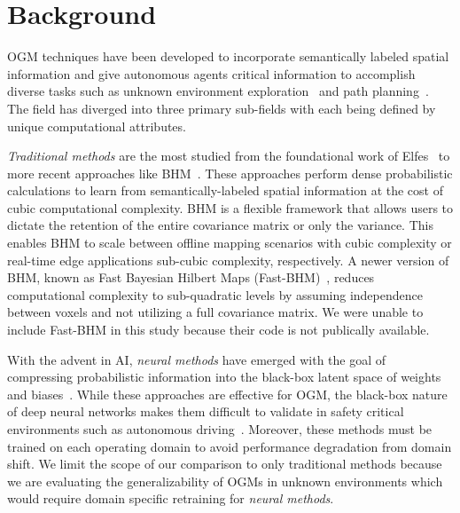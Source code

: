 \section{Background}
\label{sec:background}

\noindent
OGM techniques have been developed to incorporate semantically labeled spatial information and give autonomous agents critical information to accomplish diverse tasks such as unknown environment exploration~\cite{robotics13010012} and path planning~\cite{zhao2024exploration}. The field has diverged into three primary sub-fields with each being defined by unique computational attributes.

\textit{Traditional methods} are the most studied from the foundational work of Elfes~\cite{elfes1989using} to more recent approaches like BHM~\cite{senanayake2017bayesian}. These approaches perform dense probabilistic calculations to learn from semantically-labeled spatial information at the cost of cubic computational complexity. BHM is a flexible framework that allows users to dictate the retention of the entire covariance matrix or only the variance. This enables BHM to scale between offline mapping scenarios with cubic complexity or real-time edge applications sub-cubic complexity, respectively.  
A newer version of BHM, known as Fast Bayesian Hilbert Maps (Fast-BHM)~\cite{zhi2019continuous}, reduces computational complexity to sub-quadratic levels by assuming independence between voxels and not utilizing a full covariance matrix. We were unable to include Fast-BHM in this study because their code is not publically available.

With the advent in AI, \textit{neural methods} have emerged with the goal of compressing probabilistic information into the black-box latent space of weights and biases~\cite{evilog}. While these approaches are effective for OGM, the black-box nature of deep neural networks makes them difficult to validate in safety critical environments such as autonomous driving~\cite{REDA2024104630}. Moreover, these methods must be trained on each operating domain to avoid performance degradation from domain shift. We limit the scope of our comparison to only traditional methods because we are evaluating the generalizability of OGMs in unknown environments which would require domain specific retraining for \textit{neural methods}.

